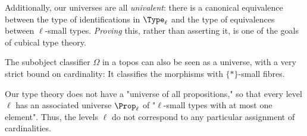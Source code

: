 \begin{node}
%
Additionally, our universes are all \emph{univalent}: there is a
canonical equivalence between the type of identifications in
\(\Type_\ell\) and the type of equivalences between \(\ell\)-small
types. \emph{Proving} this, rather than asserting it, is one of the
goals of cubical type theory.
%
\end{node}

\begin{remark}
The subobject classifier \(\Omega\) in a topos can also be seen as a
universe, with a very strict bound on cardinality: It classifies the
morphisms with \(\{*\}\)-small fibres.
\end{remark}

\begin{remark}
Our type theory does not have a "universe of all propositions," so that
every level \(\ell\) has an associated universe \(\Prop_\ell\) of
"\(\ell\)-small types with at most one element". Thus, the levels
\(\ell\) do not correspond to any particular assignment of
cardinalities.
\end{remark}
